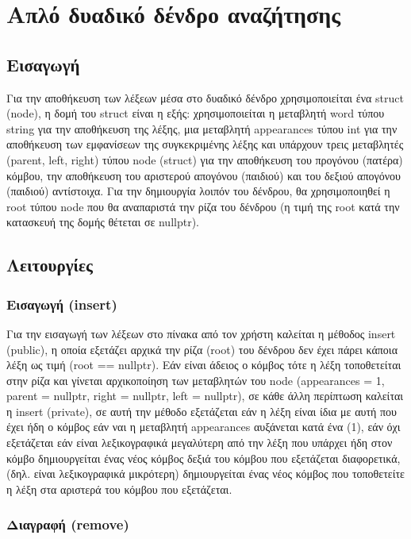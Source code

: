 \chapter{Απλό δυαδικό δένδρο αναζήτησης}

\section{Εισαγωγή}

Για την αποθήκευση των λέξεων μέσα στο δυαδικό δένδρο χρησιμοποιείται ένα struct (node), η δομή του struct είναι η εξής: χρησιμοποιείται η μεταβλητή word τύπου string για την αποθήκευση της λέξης, μια μεταβλητή appearances τύπου int για την αποθήκευση των εμφανίσεων της συγκεκριμένης λέξης και υπάρχουν τρεις μεταβλητές (parent, left, right) τύπου node (struct) για την αποθήκευση του προγόνου (πατέρα) κόμβου, την αποθήκευση του αριστερού απογόνου (παιδιού) και του δεξιού απογόνου (παιδιού) αντίστοιχα. 
Για την δημιουργία λοιπόν του δένδρου, θα χρησιμοποιηθεί η root τύπου node που θα αναπαριστά την ρίζα του δένδρου (η τιμή της root κατά την κατασκευή της δομής θέτεται σε nullptr).


\section{Λειτουργίες}

\subsection{Eισαγωγή (insert)}

Για την εισαγωγή των λέξεων στο πίνακα από τον χρήστη καλείται η μέθοδος insert (public), η οποία εξετάζει αρχικά την ρίζα (root) του δένδρου δεν έχει πάρει κάποια λέξη ως τιμή (root == nullptr). Εάν είναι άδειος ο κόμβος τότε η λέξη τοποθετείται στην ρίζα και γίνεται αρχικοποίηση των μεταβλητών του node (appearances = 1, parent = nullptr, right = nullptr, left = nullptr), σε κάθε άλλη περίπτωση καλείται η insert (private), σε αυτή την μέθοδο εξετάζεται εάν η λέξη είναι ίδια με αυτή που έχει ήδη ο κόμβος εάν ναι η μεταβλητή appearances αυξάνεται κατά ένα (1), εάν όχι εξετάζεται εάν είναι λεξικογραφικά μεγαλύτερη από την λέξη που υπάρχει ήδη στον κόμβο δημιουργείται ένας νέος κόμβος δεξιά του κόμβου που εξετάζεται διαφορετικά, (δηλ. είναι λεξικογραφικά μικρότερη) δημιουργείται ένας νέος κόμβος που τοποθετείτε η λέξη στα αριστερά του κόμβου που εξετάζεται.

\subsection{Διαγραφή (remove)}

